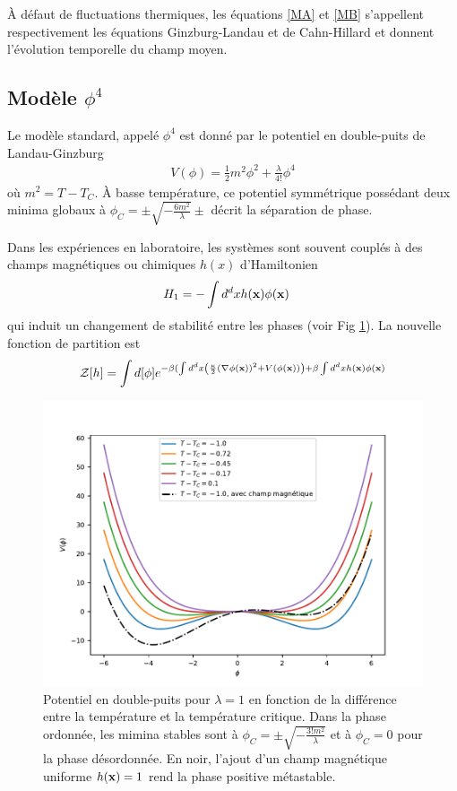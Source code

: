 À défaut de fluctuations thermiques, les équations \ref{MA} et \ref{MB} s'appellent respectivement les équations Ginzburg-Landau et de Cahn-Hillard \cite{cahn_free_nodate,langer_new_1975,kawasaki_growth_1978} et donnent l'évolution temporelle du champ moyen. 

    \subsection{Modèle $\phi^4$}
    
Le modèle standard, appelé $\phi^4$ est donné par le potentiel en double-puits de Landau-Ginzburg \cite[§ 45]{l_landau_physique_1990} 
\begin{align}
    V(\phi) = \frac{1}{2} m^2 \phi^2 + \frac{\lambda}{4!} \phi^4
    \label{phi4}
\end{align} 
où $m^2 = T-T_C$. À basse température, ce potentiel symmétrique possédant deux minima globaux à $\phi_C = \pm \sqrt{- \frac{6 m^2}{\lambda} } \pm$ décrit la séparation de phase.


Dans les expériences en laboratoire, les systèmes sont souvent couplés à des champs magnétiques ou chimiques $h(x)$ d'Hamiltonien
\begin{align}
    H_1 &= - \int d^dx h({\bf x})\phi({\bf x})
    \label{champ-externe}
\end{align}
qui induit un changement de stabilité entre les phases (voir Fig \ref{double-puits-temperature}). La nouvelle fonction de partition est
\begin{align}
    \mathcal{Z}[h] = \int d [\phi] e^{ - \beta (\int d^d x \left( \frac{\kappa}{2} (\nabla \phi({\bf x}))^2 + V(\phi({\bf x})) \right) + \beta \int d^d x h({\bf x}) \phi({\bf x})}
\end{align}

\begin{figure}
    \centering
    \includegraphics[width=0.6\linewidth]{intro/double-puit-en-fonction-temp.pdf}
    \caption{Potentiel en double-puits pour $\lambda=1$ en fonction de la différence entre la température et la température critique. Dans la phase ordonnée, les mimina stables sont à $\phi_C =\pm \sqrt{- \frac{3! m^2}{\lambda} } $ et à $\phi_C = 0$ pour la phase désordonnée. En noir, l'ajout d'un champ magnétique uniforme $h({\bf x}) = 1$ rend la phase positive métastable.}
    \label{double-puits-temperature}
\end{figure}

